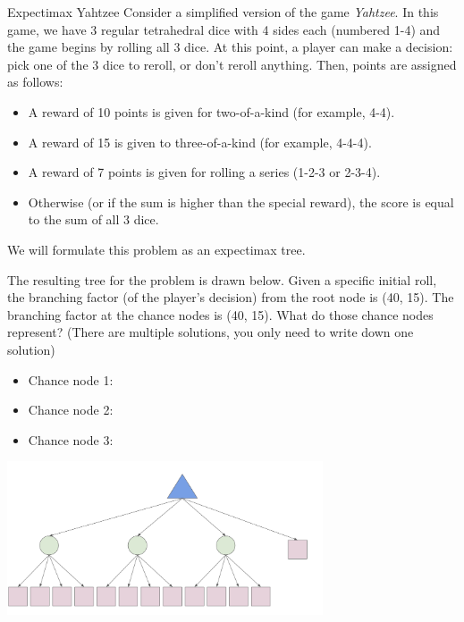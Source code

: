 \begin{problem}{Expectimax Yahtzee}
Consider a simplified version of the game \textit{Yahtzee}. In this game, we have 3 regular tetrahedral dice with 4 sides each (numbered 1-4) and the game begins by rolling all 3 dice. At this point, a player can make a decision: pick one of the 3 dice to reroll, or don't reroll anything. Then, points are assigned as follows:
\begin{itemize}
    \item A reward of 10 points is given for two-of-a-kind (for example, 4-4).
    \item A reward of 15 is given to three-of-a-kind (for example, 4-4-4).
    \item A reward of 7 points is given for rolling a series (1-2-3 or 2-3-4).
    \item Otherwise (or if the sum is higher than the special reward), the score is equal to the sum of all 3 dice.
\end{itemize}

\begin{question}
We will formulate this problem as an expectimax tree.  

\begin{subquestion}[3]
The resulting tree for the problem is drawn below. Given a specific initial roll, the branching factor (of the player's decision) from the root node is \framebox(40, 15). The branching factor at the chance nodes is \framebox(40, 15). What do those chance nodes represent? (There are multiple solutions, you only need to write down one solution)
\begin{itemize}
    \item Chance node 1:
    \item Chance node 2:
    \item Chance node 3:
\end{itemize}

\begin{center}
\includegraphics[width=0.7\textwidth]{figures/q1_graph_noblank.png}
\label{fig:expectimaxempty}
\end{center}


\end{subquestion}
\end{question}
\end{problem}
